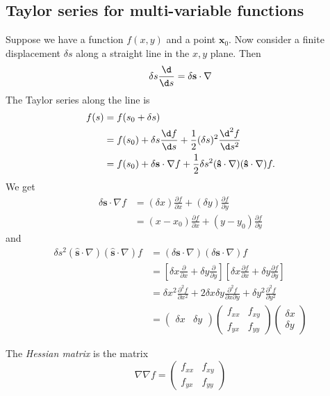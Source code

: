 \documentclass[a4paper]{article}
\begin{document}
\subsection{Taylor series for multi-variable functions}
Suppose we have a function $f(x, y)$ and a point $\mathbf{x}_0$. Now consider a finite displacement $\delta s$ along a straight line in the $x,y$ plane. Then
\[
  \delta s\frac{\d }{\d s} = \delta \mathbf{s}\cdot \nabla
\]
The Taylor series along the line is
\begin{align*}
  f(s) &= f(s_0 + \delta s)\\
  &=f(s_0) + \delta s\frac{\d f}{\d s} + \frac{1}{2}(\delta s)^2\frac{\d ^2 f}{\d s^2}\\
  &= f(s_0) + \delta \mathbf{s} \cdot \nabla f + \frac{1}{2}\delta s^2 (\mathbf{\hat{s}}\cdot \nabla)(\mathbf{\hat{s}}\cdot \nabla)f.
\end{align*}
We get
\begin{align*}
  \delta \mathbf{s}\cdot \nabla f &= (\delta x)\frac{\partial f}{\partial x} + (\delta y)\frac{\partial f}{\partial y}\\
  &= (x - x_0)\frac{\partial f}{\partial x} + (y - y_0)\frac{\partial f}{\partial y}
\end{align*}
and
\begin{align*}
  \delta s^2 (\mathbf{\hat{s}}\cdot \nabla)(\mathbf{\hat{s}}\cdot \nabla)f &= (\delta \mathbf{s}\cdot \nabla)(\delta \mathbf{s}\cdot \nabla) f\\
  &= \left[\delta x\frac{\partial }{\partial x} + \delta y\frac{\partial}{\partial y}\right]\left[\delta x\frac{\partial f}{\partial x} + \delta y\frac{\partial f}{\partial y}\right]\\
  &= \delta x^2 \frac{\partial^2 f}{\partial x^2} + 2\delta x\delta y\frac{\partial^2 f}{\partial x\partial y} + \delta y^2 \frac{\partial^2 f}{\partial y^2}\\
  &=
  \begin{pmatrix}
    \delta x& \delta y
  \end{pmatrix}
  \begin{pmatrix}
    f_{xx}&f_{xy}\\
    f_{yx}&f_{yy}
  \end{pmatrix}
  \begin{pmatrix}
    \delta x\\\delta y
  \end{pmatrix}
\end{align*}
\begin{defi}
  The \emph{Hessian matrix} is the matrix
  \[
    \nabla \nabla f =
    \begin{pmatrix}
      f_{xx}&f_{xy}\\
      f_{yx}&f_{yy}
    \end{pmatrix}
  \]
\end{defi}
\end{document}
